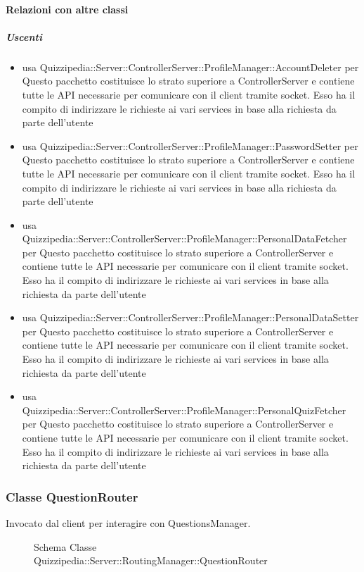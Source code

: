 \paragraph{Relazioni con altre classi}
\subparagraph{Uscenti}
\begin{itemize}
\item usa Quizzipedia::Server::ControllerServer::ProfileManager::AccountDeleter per Questo pacchetto costituisce lo strato superiore a ControllerServer e contiene tutte le API necessarie per comunicare con il client tramite socket. Esso ha il compito di indirizzare le richieste ai vari services in base alla richiesta da parte dell'utente
\item usa Quizzipedia::Server::ControllerServer::ProfileManager::PasswordSetter per Questo pacchetto costituisce lo strato superiore a ControllerServer e contiene tutte le API necessarie per comunicare con il client tramite socket. Esso ha il compito di indirizzare le richieste ai vari services in base alla richiesta da parte dell'utente
\item usa Quizzipedia::Server::ControllerServer::ProfileManager::PersonalDataFetcher per Questo pacchetto costituisce lo strato superiore a ControllerServer e contiene tutte le API necessarie per comunicare con il client tramite socket. Esso ha il compito di indirizzare le richieste ai vari services in base alla richiesta da parte dell'utente
\item usa Quizzipedia::Server::ControllerServer::ProfileManager::PersonalDataSetter per Questo pacchetto costituisce lo strato superiore a ControllerServer e contiene tutte le API necessarie per comunicare con il client tramite socket. Esso ha il compito di indirizzare le richieste ai vari services in base alla richiesta da parte dell'utente
\item usa Quizzipedia::Server::ControllerServer::ProfileManager::PersonalQuizFetcher per Questo pacchetto costituisce lo strato superiore a ControllerServer e contiene tutte le API necessarie per comunicare con il client tramite socket. Esso ha il compito di indirizzare le richieste ai vari services in base alla richiesta da parte dell'utente
\end{itemize}
\subsubsection{Classe QuestionRouter}
Invocato dal client per interagire con QuestionsManager.
\begin{figure}[H]
\centering
\noindent{}
\caption[Schema Classe QuestionRouter]{Schema Classe Quizzipedia::Server::RoutingManager::QuestionRouter}
\end{figure}
